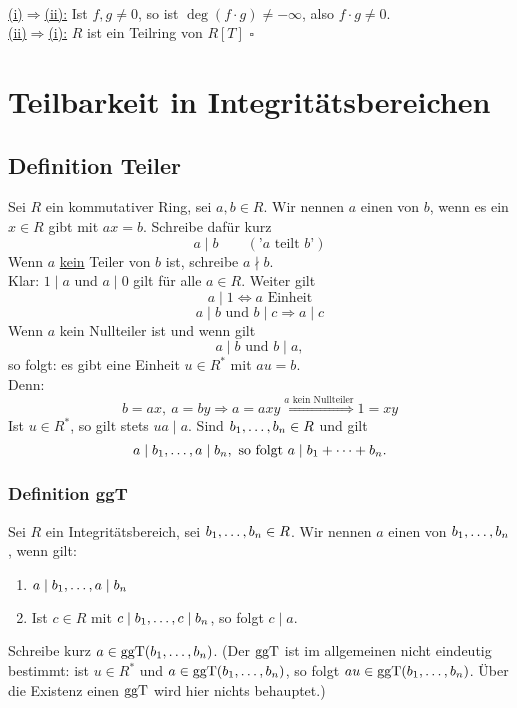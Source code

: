 \\
\uline{(i)$\Rightarrow$(ii):}
Ist $f,g\neq 0$, so ist $\deg(f\cdot g)\neq -\infty$, also $f\cdot g\neq 0$.\\
\uline{(ii)$\Rightarrow$(i):}
$R$ ist ein Teilring von $R[T]$
\hfill $\square$

\newpage

\section{Teilbarkeit in Integritätsbereichen}
\label{sec:teilbarkeit_intbereiche}
\subsection{Definition Teiler}
\label{sub:def_teiler}
Sei $R$ ein kommutativer Ring, sei $a,b\in R$.
Wir nennen $a$ einen  von $b$, wenn es ein $x\in R$ gibt mit $ax=b$.
Schreibe dafür kurz
\[
a\mid b\qquad (\text{'$a$ teilt $b$'})
\]
Wenn $a$ \uline{kein} Teiler von $b$ ist, schreibe $a\nmid b$.\\
Klar: $1\mid a$ und $a\mid 0$ gilt für alle $a\in R$.
Weiter gilt 
\[
a\mid 1 \Leftrightarrow a\text{ Einheit}
\]
\[
a\mid b\text{ und } b\mid c \Rightarrow a\mid c
\]
Wenn $a$ kein Nullteiler ist und wenn gilt
\[
a\mid b\text{ und } b\mid a,
\]
so folgt: es gibt eine Einheit $u\in R^*$  mit $au=b$.\\
Denn:
\[
b=ax,~ a=by \Rightarrow a=axy \stackrel{a\text{ kein Nullteiler}}{\Rightarrow} 1=xy
\]
Ist $u\in R^*$, so gilt stets $ua\mid a$.
Sind $b_1, \dots ,b_n\in R$ und gilt
\[
a\mid b_1, \dots , a\mid b_n,\text{ so folgt } a\mid b_1+ \dots +b_n.
\]

\subsubsection*{Definition ggT}
Sei $R$ ein Integritätsbereich, sei $b_1, \dots ,b_n\in R$.
Wir nennen $a$ einen  von $b_1, \dots ,b_n$, wenn gilt:
\begin{enumerate}[(1)]
	\item $a\mid b_1, \dots ,a\mid b_n$
	\item Ist $c\in R$ mit $c\mid b_1, \dots , c\mid b_n$, so folgt $c\mid a$.
\end{enumerate}
Schreibe kurz $a\in \operatorname{ggT}(b_1, \dots ,b_n)$. (Der $\operatorname{ggT}$ ist im allgemeinen nicht eindeutig bestimmt: ist $u\in R^*$ und $a\in \operatorname{ggT}(b_1, \dots ,b_n)$, so folgt $au\in \operatorname{ggT}(b_1, \dots ,b_n)$.
Über die Existenz einen $\operatorname{ggT}$ wird hier nichts behauptet.)

